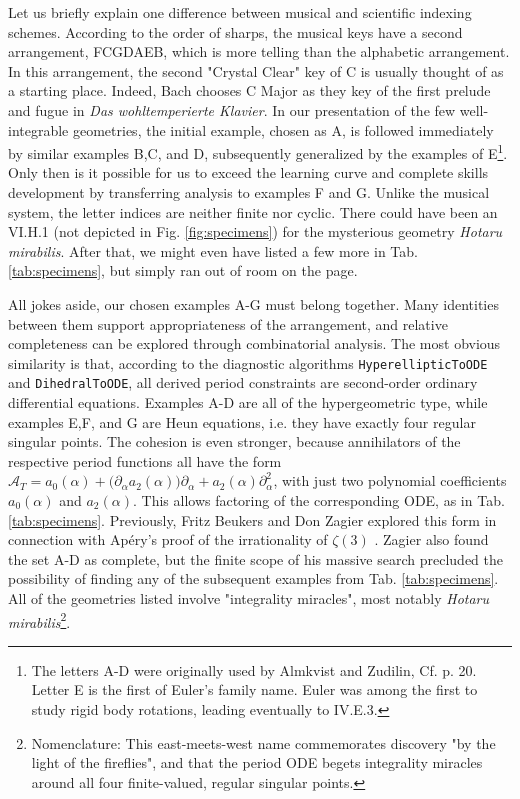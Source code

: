 \documentclass[nofootinbib,preprint]{revtex4-1}
\begin{document}
Let us briefly explain one difference between musical and scientific indexing schemes. 
According to the order of sharps, the musical keys have a second arrangement, FCGDAEB, which 
is more telling than the alphabetic arrangement. In this arrangement, the second "Crystal Clear" 
key of C is usually thought of as a starting place. Indeed, Bach chooses C Major as they key of 
the first prelude and fugue in \textit{Das wohltemperierte Klavier}. In our presentation of the 
few well-integrable geometries, the initial example, chosen as A, is followed immediately 
by similar examples B,C, and D, subsequently generalized by the examples of E\footnote{The 
letters A-D were originally used by Almkvist and Zudilin, Cf. \cite{AZ2004} p. 20.  
Letter E is the first of Euler's family name. Euler was among the first to study rigid body 
rotations, leading eventually to IV.E.3.}. Only then is it possible for us to exceed the 
learning curve and complete skills development by transferring analysis to examples F and G. 
Unlike the musical system, the letter indices are neither finite nor cyclic. There could 
have been an VI.H.1 (not depicted in Fig. \ref{fig:specimens}) for the mysterious 
geometry \textit{Hotaru mirabilis}. After that, we might even have listed a few more in 
Tab. \ref{tab:specimens}, but simply ran out of room on the page.
  
All jokes aside, our chosen examples A-G must belong together. Many identities between them 
support appropriateness of the arrangement, and relative completeness can be explored through 
combinatorial analysis. The most obvious similarity is that, according to the diagnostic
algorithms \texttt{HyperellipticToODE} and \texttt{DihedralToODE},  all derived period
constraints are second-order ordinary differential equations. Examples A-D are all of 
the hypergeometric type, while examples E,F, and G are Heun equations, i.e. they have
exactly four regular singular points. The cohesion is even stronger, because
annihilators of the respective period functions all have the form 
$\mathcal{A}_T=a_0(\alpha)+\big(\partial_{\alpha}a_2(\alpha)\big)\partial_{\alpha}+a_2(\alpha)\partial_{\alpha}^2$,
with just two polynomial coefficients $a_0(\alpha)$ and $a_2(\alpha)$. This allows factoring
of the corresponding ODE, as in Tab. \ref{tab:specimens}. Previously, Fritz Beukers and Don
Zagier explored this form in connection with Ap\'{e}ry's proof of the irrationality of $\zeta(3)$
\cite{ZAGIER2009}. Zagier also found the set A-D as complete, but the finite scope of his massive search precluded 
the possibility of finding any of the subsequent examples from Tab. \ref{tab:specimens}. 
All of the geometries listed involve "integrality miracles", most notably 
\textit{Hotaru mirabilis}\footnote{Nomenclature: This east-meets-west name commemorates 
discovery "by the light of the fireflies", and that the period ODE begets integrality 
miracles around all four finite-valued, regular singular points.}.  
\end{document}
